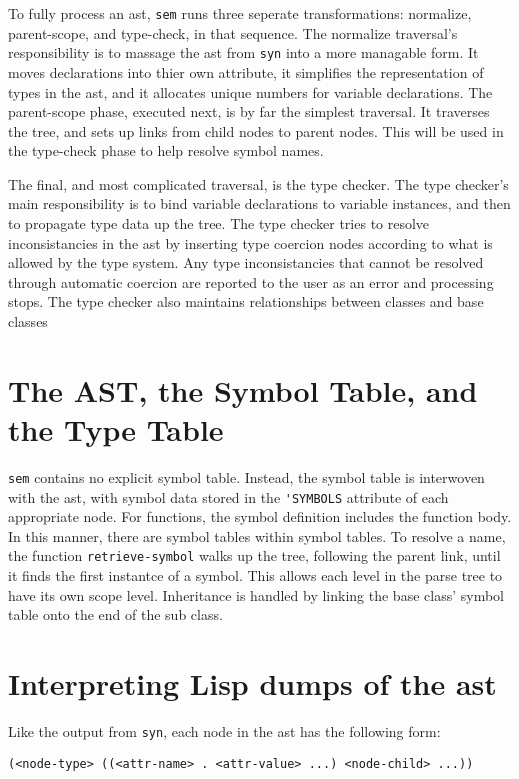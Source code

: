 \documentclass{article}[1994/05/24]
\begin{document}
	To fully process an ast, \verb|sem| runs three seperate
transformations: normalize, parent-scope, and type-check, in that
sequence.  The normalize traversal's responsibility is to massage the
ast from \verb|syn| into a more managable form.  It moves declarations
into thier own attribute, it simplifies the representation of types in 
the ast, and it allocates unique numbers for variable declarations.  The
parent-scope phase, executed next, is by far the simplest traversal.  It
traverses the tree, and sets up links from child nodes to parent nodes.
This will be used in the type-check phase to help resolve symbol names.

	The final, and most complicated traversal, is the type checker.
The type checker's main responsibility is to bind variable declarations
to variable instances, and then to propagate type data up the tree.
The type checker tries to resolve inconsistancies in the ast by
inserting type coercion nodes according to what is allowed by the
type system. Any type inconsistancies that cannot be resolved through
automatic coercion are reported to the user as an error and processing 
stops. The type checker also maintains relationships between classes
and base classes

\section{The AST, the Symbol Table, and the Type Table}

	\verb|sem| contains no explicit symbol table.  Instead, the
symbol table is interwoven with the ast, with symbol data stored
in the \verb|'SYMBOLS| attribute of each appropriate node.  For functions,
the symbol definition includes the function body.  In this manner, there
are symbol tables within symbol tables. To resolve a name, the
function \verb|retrieve-symbol| walks up the tree, following the
parent link, until it finds the first instantce of a symbol. This allows
each level in the parse tree to have its own scope level. Inheritance
is handled by linking the base class' symbol table onto the end of
the sub class.

\section{Interpreting Lisp dumps of the ast}

Like the output from \verb|syn|, each node in the ast has the following
form:

\begin{verbatim}
(<node-type> ((<attr-name> . <attr-value> ...) <node-child> ...))
\end{verbatim}
\end{document}
